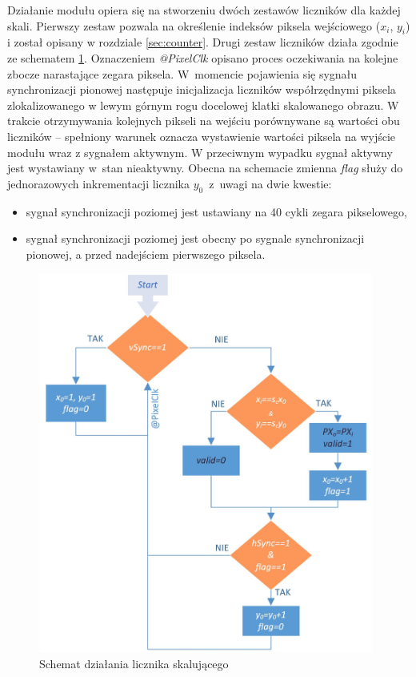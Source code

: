 Działanie modułu opiera się na stworzeniu dwóch zestawów liczników dla każdej skali. 
Pierwszy zestaw pozwala na określenie indeksów piksela wejściowego ($x_i$, $y_i$) i został opisany w rozdziale \ref{sec:counter}. 
Drugi zestaw liczników działa zgodnie ze schematem \ref{fig:scaling_sch}.
Oznaczeniem \mbox{\textit{@PixelClk}} opisano proces oczekiwania na kolejne zbocze narastające zegara piksela. 
W~momencie pojawienia się sygnału synchronizacji pionowej następuje inicjalizacja liczników współrzędnymi piksela zlokalizowanego w lewym górnym rogu docelowej klatki skalowanego obrazu. 
W trakcie otrzymywania kolejnych pikseli na wejściu porównywane są wartości obu liczników -- spełniony warunek oznacza wystawienie wartości piksela na wyjście modułu wraz z sygnałem aktywnym. 
W przeciwnym wypadku sygnał aktywny jest wystawiany w~stan nieaktywny. 
Obecna na schemacie zmienna \textit{flag} służy do jednorazowych inkrementacji licznika $y_0$~z~uwagi na dwie kwestie:
\begin{itemize}
	\item sygnał synchronizacji poziomej jest ustawiany na 40 cykli zegara pikselowego,
	\item sygnał synchronizacji poziomej jest obecny po sygnale synchronizacji pionowej, a przed nadejściem pierwszego piksela.
\end{itemize}   
\begin{figure}[!h]
	\centering
	\includegraphics[width=11cm]{4_scaling.jpg}
	\caption{Schemat działania licznika skalującego}
	\label{fig:scaling_sch}
\end{figure}


